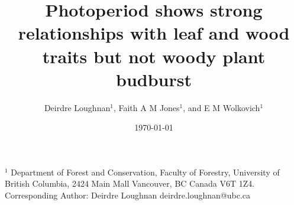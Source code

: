 \documentclass{article}
\begin{document}
\renewcommand{\bibname}{References}%



\title{Photoperiod shows strong relationships with leaf and wood traits but not woody plant budburst} %
\date{\today}
\author{Deirdre Loughnan$^1$, Faith A M Jones$^1$, and E M Wolkovich$^1$}
\maketitle 
$^1$ Department of Forest and Conservation, Faculty of Forestry, University of British Columbia, 2424 Main Mall
Vancouver, BC Canada V6T 1Z4. \\


Corresponding Author: Deirdre Loughnan deirdre.loughnan@ubc.ca \\
\end{document}
